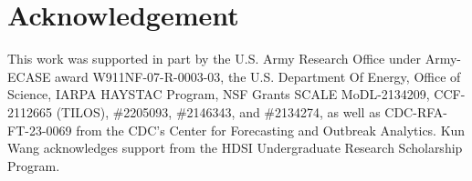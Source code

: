 \section*{Acknowledgement}

This work was supported in part by the U.S. Army Research Office under Army-ECASE award W911NF-07-R-0003-03, the U.S. Department Of Energy, Office of Science, IARPA HAYSTAC Program, NSF Grants SCALE MoDL-2134209, CCF-2112665 (TILOS), \#2205093, \#2146343, and \#2134274, as well as CDC-RFA-FT-23-0069 from the CDC’s Center for Forecasting and Outbreak Analytics. Kun Wang acknowledges support from the HDSI Undergraduate Research Scholarship Program.